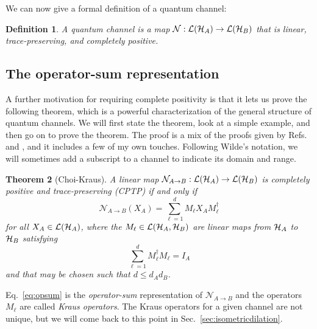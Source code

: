 \documentclass[a4paper,11pt]{article}
\newtheorem{thm}{Theorem}[section]
\newtheorem{defn}[thm]{Definition}
\newcommand{\Eq}[1]{Eq.~\eqref{#1}}
\newcommand{\Sec}[1]{Sec.~\ref{#1}}
\newcommand{\Hil}{{\cal H}}
\newcommand{\Note}{\noindent {\bf Note:~}}
\begin{document}
We can now give a formal definition of a quantum channel:

\begin{defn}
A \emph{quantum channel} is a map $\mathcal{N} : \mathcal{L}(\Hil_A) \rightarrow \mathcal{L}(\Hil_B)$ that is linear, trace-preserving, and completely positive.
\end{defn}


\subsection{The operator-sum representation}

A further motivation for requiring complete positivity is that it lets us prove the following theorem, which is a powerful characterization of the general structure of quantum channels.
We will first state the theorem, look at a simple example, and then go on to prove the theorem.
The proof is a mix of the proofs given by Refs.~\cite{preskill} and \cite{Wilde:2011npi}, and it includes a few of my own touches.
Following Wilde's notation, we will sometimes add a subscript to a channel to indicate its domain and range.
\begin{thm}[Choi-Kraus] \label{thm:choi-kraus}
A linear map $\mathcal{N}_{A \rightarrow B} : \mathcal{L}(\Hil_A) \rightarrow \mathcal{L}(\Hil_B)$ is completely positive and trace-preserving (CPTP) if and only if
\begin{equation} \label{eq:opsum}
\mathcal{N}_{A \rightarrow B}(X_A) = \sum_{\ell = 1}^d M_\ell X_A M_\ell^\dagger
\end{equation}
for all $X_A \in \mathcal{L}(\Hil_A)$, where the $M_\ell \in \mathcal{L}(\Hil_A, \Hil_B)$ are linear maps from $\Hil_A$ to $\Hil_B$ satisfying
\begin{equation}
\sum_{\ell=1}^d M_\ell^\dagger M_\ell = I_A
\end{equation}
and that may be chosen such that $d \leq d_A d_B$.
\end{thm}
\Note \Eq{eq:opsum} is the \emph{operator-sum} representation of $\mathcal{N}_{A \rightarrow B}$ and
the operators $M_\ell$ are called \emph{Kraus operators}.
The Kraus operators for a given channel are not unique, but we will come back to this point in \Sec{sec:isometricdilation}.
\end{document}
